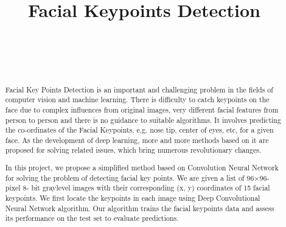 \documentclass[conference]{IEEEtran}
\begin{document}
\title{\textbf{Facial Keypoints Detection}\\
\vspace{0.29cm}
\large \\
\large \\
{\footnotesize \textsuperscript{}}
}


\author
{
\and
{}
\and
{}
}


\maketitle

\begin{abstract}
Facial Key Points Detection is an important and challenging problem in the fields of computer vision and machine learning. There is difficulty to catch keypoints on the face due to complex influences from original images, very different facial features from person to person and there is no guidance to suitable algorithms. It involves predicting the co-ordinates of the Facial Keypoints, e.g. nose tip, center of eyes, etc, for a given face. As the development of deep learning, more and more methods based on it are proposed for solving related issues, which bring numerous revolutionary changes.

In this project, we propose a simplified method based on Convolution Neural Network for solving the problem of detecting facial key points. We are given a list of 96×96-pixel 8- bit graylevel images with their corresponding (x, y) coordinates of 15 facial keypoints. We first locate the keypoints in each image using Deep Convolutional Neural Network algorithm. Our algorithm trains the facial keypoints data and assess its performance on the test set to evaluate predictions. 
\end{abstract}
\end{document}
